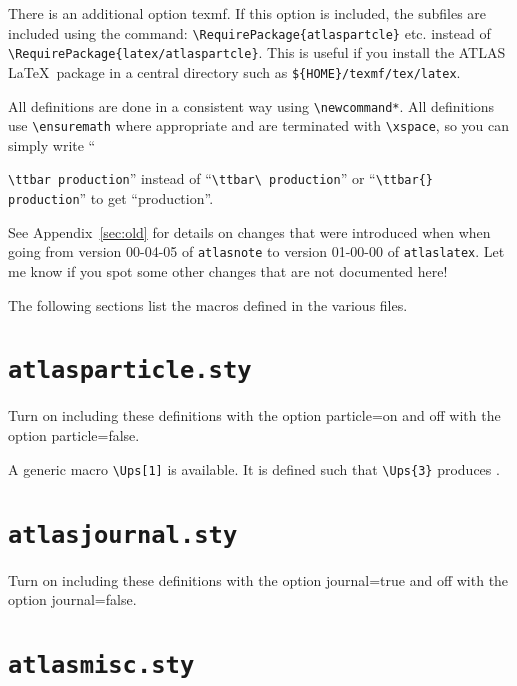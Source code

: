\documentclass[koma,UKenglish]{latex/atlasdoc}
\newcommand{\File}[1]{\texttt{#1}\xspace}
\newcommand{\Option}[1]{\textsf{#1}\xspace}
\newcommand{\Package}[1]{\texttt{#1}\xspace}
\begin{document}
There is an additional option \Option{texmf}.
If this option is included, the subfiles are included using the command:
\verb|\RequirePackage{atlaspartcle}| etc. instead of \verb|\RequirePackage{latex/atlaspartcle}|.
This is useful if you install the ATLAS \LaTeX\ package in a central directory such as \File{\$\{HOME\}/texmf/tex/latex}.

All definitions are done in a consistent way using \verb|\newcommand*|.
All definitions use \verb|\ensuremath| where appropriate and are terminated with
\verb|\xspace|, so you can simply write ``{\verb|\ttbar production|'' instead of
``\verb|\ttbar\ production|'' or ``\verb|\ttbar{} production|'' to get \enquote{\ttbar production}.

See Appendix~\ref{sec:old} for details on changes that were introduced when
when going from version 00-04-05 of \Package{atlasnote}
to version 01-00-00 of \Package{atlaslatex}.
Let me know if you spot some other changes that are not documented here!

The following sections list the macros defined in the various files.

\twocolumn
\section{\File{atlasparticle.sty}}

Turn on including these definitions with the option \Option{particle=on} and off with the option \Option{particle=false}.



A generic macro \verb|\Ups[1]| is available.
It is defined such that \verb|\Ups{3}| produces .


\newpage
\section{\File{atlasjournal.sty}}

Turn on including these definitions with the option \Option{journal=true} and off with the option \Option{journal=false}.




\newpage
\section{\File{atlasmisc.sty}}

}
\end{document}
